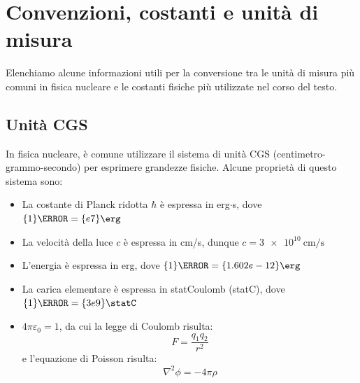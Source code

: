 \appendix
\chapter[Costanti e unità]{Convenzioni, costanti e unità di misura}
Elenchiamo alcune informazioni utili per la conversione tra le unità di misura più comuni in fisica nucleare e le costanti fisiche più utilizzate nel corso del testo.
\section{Unità CGS}
In fisica nucleare, è comune utilizzare il sistema di unità CGS (centimetro-grammo-secondo) per esprimere grandezze fisiche. Alcune proprietà di questo sistema sono:
\begin{itemize}
    \item La costante di Planck ridotta $\hbar$ è espressa in erg$\cdot$s, dove $\qty{1}{\joule} = \qty{e7}{\erg}$
    \item La velocità della luce $c$ è espressa in cm/s, dunque $c = \qty{3e10}{\centi\meter\per\second}$
    \item L'energia è espressa in erg, dove $\qty{1}{\electronvolt} = \qty{1.602e-12}{\erg}$
    \item La carica elementare è espressa in statCoulomb (statC), dove $\qty{1}{\coulomb} = \qty{3e9}{\statC}$
    \item $4\pi\varepsilon_0 = 1$, da cui la legge di Coulomb risulta:
    \begin{equation}
        F = \dfrac{q_1 q_2}{r^2}
    \end{equation}
    e l'equazione di Poisson risulta:
    \begin{equation}
        \nabla^2 \phi = -4 \pi \rho
    \end{equation}
\end{itemize}
